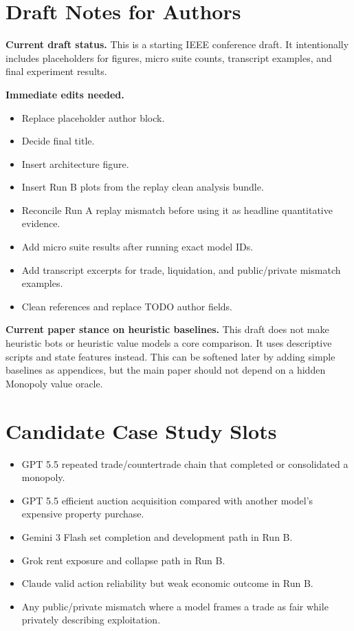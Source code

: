 \documentclass[conference]{IEEEtran}
\begin{document}
\appendices

\section{Draft Notes for Authors}

\textbf{Current draft status.} This is a starting IEEE conference draft. It intentionally includes placeholders for figures, micro suite counts, transcript examples, and final experiment results.

\textbf{Immediate edits needed.}
\begin{itemize}
    \item Replace placeholder author block.
    \item Decide final title.
    \item Insert architecture figure.
    \item Insert Run B plots from the replay clean analysis bundle.
    \item Reconcile Run A replay mismatch before using it as headline quantitative evidence.
    \item Add micro suite results after running exact model IDs.
    \item Add transcript excerpts for trade, liquidation, and public/private mismatch examples.
    \item Clean references and replace TODO author fields.
\end{itemize}

\textbf{Current paper stance on heuristic baselines.} This draft does not make heuristic bots or heuristic value models a core comparison. It uses descriptive scripts and state features instead. This can be softened later by adding simple baselines as appendices, but the main paper should not depend on a hidden Monopoly value oracle.

\section{Candidate Case Study Slots}

\begin{itemize}
    \item GPT 5.5 repeated trade/countertrade chain that completed or consolidated a monopoly.
    \item GPT 5.5 efficient auction acquisition compared with another model's expensive property purchase.
    \item Gemini 3 Flash set completion and development path in Run B.
    \item Grok rent exposure and collapse path in Run B.
    \item Claude valid action reliability but weak economic outcome in Run B.
    \item Any public/private mismatch where a model frames a trade as fair while privately describing exploitation.
\end{itemize}
\end{document}
